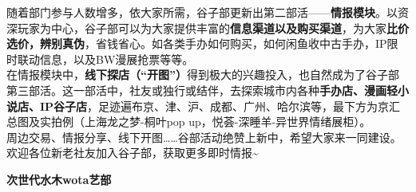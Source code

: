     \hfill
{}
    \par
\vspace{0.5em}
\chind 随着部门参与人数增多，依大家所需，谷子部更新出第二部活——\textbf{情报模块}。以资深玩家为中心，谷子部可以为大家提供丰富的\textbf{信息渠道以及购买渠道}，为大家\textbf{比价选价，辨别真伪}，省钱省心。如各类手办如何购买，如何闲鱼收中古手办，IP限时联动信息，以及BW漫展抢票等等。\\
\chind 在情报模块中，\textbf{线下探店（“开图”）}得到极大的兴趣投入，也自然成为了谷子部第三部活。这一部活中，社友或独行或结伴，去探索城市内各种\textbf{手办店、漫画轻小说店、IP谷子店}，足迹遍布京、津、沪、成都、广州、哈尔滨等，最下方为京汇总图及实拍例（上海龙之梦-桐叶pop up，悦荟-深睡羊-异世界情绪展柜）。\\
\chind 周边交易、情报分享、线下开图……谷部活动绝赞上新中，希望大家来一同建设。欢迎各位新老社友加入谷子部，获取更多即时情报\~{}
\par
{}
    \hfill
\newpage
    \fontsize{23pt}{24pt}\selectfont
    \textbf{\textcolor{truepurple}{次世代水木wota艺部}}\\
    \vspace{0.7em}

